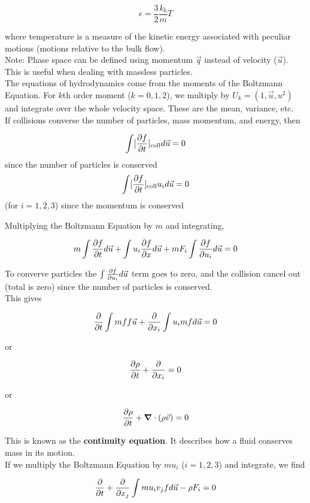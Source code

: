 \documentclass[]{article}
\begin{document}
\[\epsilon = \frac{3}{2} \frac{k_b}{m} T\]

where temperature is a measure of the kinetic energy associated with peculiar motions (motions relative to the bulk flow).\\

Note: Phase space can be defined using momentum $\vec{q}$ instead of velocity ($\vec{u}$). This is useful when dealing with massless particles.\\

The equations of hydrodynamics come from the moments of the Boltzmann Equation. For $k$th order moment ($k = 0, 1, 2$), we multiply by $U_k = (1, \vec{u}, u^2)$ and integrate over the whole velocity space. These are the mean, variance, etc.\\ 


If collisions converse the number of particles, mass momentum, and energy, then

\[\int [\pdv{f}{t}]_\text{coll} d\vec{u} = 0\] since the number of particles is conserved
\[\int [\pdv{f}{t}]_\text{coll} u_i d\vec{u} = 0\] (for $i=1, 2, 3$) since the momentum is conserved

Multiplying the Boltzmann Equation by $m$ and integrating,

\[m\int \pdv{f}{t} d\vec{u} + \int u_i \pdv{f}{x} d\vec{u} + m F_i \int \pdv{f}{u_i} d\vec{u} =0 \]

To converve particles the $\int \pdv{f}{u_i} d\vec{u} $ term goes to zero, and the collision cancel out (total is zero) since the number of particles is conserved.\\

This gives 

\[\pdv{}{t} \int m ff\vec{u} + \pdv{}{x_i} \int u_i m fd\vec{u} = 0\]

or

\[\pdv{\rho}{t} + \pdv{}{x_i}(\rho v_i) = 0\]

or 

\[\pdv{\rho}{t} + \grad \cdot(\rho \vec{v}) = 0\]

This is known as the \textbf{continuity equation}. It describes how a fluid conserves mass in its motion.\\

If we multiply the Boltzmann Equation by $m u_i$ ($i=1, 2, 3$) and integrate, we find

\[\pdv{}{t}(\rho v_i) + \pdv{}{x_j} \int m u_i v_j f d\vec{u} - \rho F_i = 0\]
\end{document}
